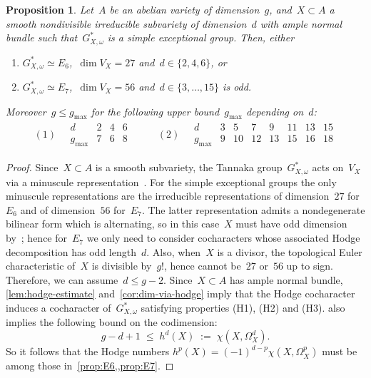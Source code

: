 \documentclass[a4paper]{amsart}
\renewcommand{\le}{\leqslant}
\theoremstyle{plain}
\newtheorem{proposition}[theorem]{Proposition}
\theoremstyle{definition}
\numberwithin{equation}{section}
\begin{document}
\begin{proposition} \label{prop:hodge-numbers}
Let~$A$ be an abelian variety of dimension~$g$, and~$X\subset A$ a smooth nondivisible irreducible subvariety of dimension~$d$ with ample normal bundle such that~$G_{X, \omega}^\ast$ is a simple exceptional group. Then, either\smallskip 
%
\begin{enumerate} 
\item $G_{X,\omega}^\ast \simeq E_6$,~$\dim V_X = 27$ and~$d\in \{2,4,6\}$, or\smallskip 
\item $G_{X,\omega}^\ast \simeq E_7$,~$\dim V_X = 56$ and~$d\in \{3,\dots,15\}$ is odd. \smallskip
\end{enumerate} 
%
Moreover~$g\le g_{\max}$ for the following upper bound~$g_{\max}$ depending on~$d$:
%
\begin{align*}
(1) \quad
\begin{array}{c|ccccc}
d & 2 & 4 & 6  \\ \hline
g_{\max} & 7 & 6 & 8 
\end{array}
&&\quad (2) \quad
\begin{array}{c|ccccccc}
d & 3 & 5 & 7 & 9 & 11 & 13 & 15 \\ \hline
g_{\max} & 9 & 10 & 12 & 13 & 15 & 16 & 18
\end{array}
\end{align*}
\end{proposition}

\begin{proof} 
Since~$X\subset A$ is a smooth subvariety, the Tannaka group~$G_{X,\omega}^\ast$ acts on~$V_X$ via a minuscule representation~\cite[cor.~1.10]{KraemerMicrolocalI}. For the simple exceptional groups the only minuscule representations are the irreducible representations of dimension~$27$ for~$E_6$ and of dimension~$56$ for~$E_7$. The latter representation admits a nondegenerate bilinear form which is alternating, so in this case~$X$ must have odd dimension by~\cite[sect.~1.2]{JKLM}; hence for~$E_7$ we only need to consider cocharacters whose associated Hodge decomposition has odd length~$d$. Also, when~$X$ is a divisor,  the topological Euler characteristic of~$X$ is divisible by~$g!$, hence cannot be~$27$ or~$56$ up to sign. Therefore, we can assume~$d \le g - 2$. Since~$X\subset A$ has ample normal bundle, \cref{lem:hodge-estimate} and~\cref{cor:dim-via-hodge} imply that the Hodge cocharacter induces a cocharacter of~$G_{X, \omega}^\ast$ satisfying properties (H1), (H2) and (H3).  also implies the following bound on the codimension:
\[ g - d + 1 \; \le \; h^d(X) \; := \; \chi(X, \Omega^d_X).\]
So it follows that the Hodge numbers
%
$
 h^p(X) = (-1)^{d-p} \chi(X, \Omega^p_X)
$
%
must be among those in~\cref{prop:E6,,prop:E7}. 
\end{proof} 
\end{document}
